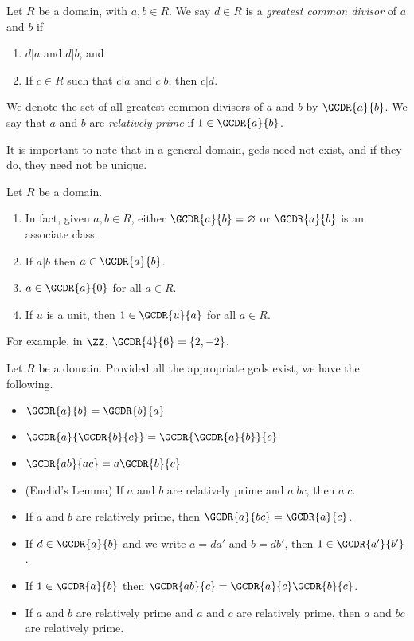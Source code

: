 \documentclass{article}
\begin{document}

\begin{dfn}
Let $R$ be a domain, with $a,b \in R$. We say $d \in R$ is a \emph{greatest common divisor} of $a$ and $b$ if
\begin{enumerate}
\item $d|a$ and $d|b$, and
\item If $c \in R$ such that $c|a$ and $c|b$, then $c|d$.
\end{enumerate}
We denote the set of all greatest common divisors of $a$ and $b$ by $\GCDR{a}{b}$. We say that $a$ and $b$ are \emph{relatively prime} if $1 \in \GCDR{a}{b}$.
\end{dfn}

It is important to note that in a general domain, gcds need not exist, and if they do, they need not be unique.

\begin{prop}
Let $R$ be a domain.
\begin{enumerate}
\item In fact, given $a,b \in R$, either $\GCDR{a}{b} = \varnothing$ or $\GCDR{a}{b}$ is an associate class.
\item If $a|b$ then $a \in \GCDR{a}{b}$.
\item $a \in \GCDR{a}{0}$ for all $a \in R$.
\item If $u$ is a unit, then $1 \in \GCDR{u}{a}$ for all $a \in R$.
\end{enumerate}
\end{prop}

For example, in $\ZZ$, $\GCDR{4}{6} = \{2, -2\}$.

\begin{prop}
Let $R$ be a domain. Provided all the appropriate gcds exist, we have the following.
\begin{itemize}
\item $\GCDR{a}{b} = \GCDR{b}{a}$
\item $\GCDR{a}{\GCDR{b}{c}} = \GCDR{\GCDR{a}{b}}{c}$
\item $\GCDR{ab}{ac} = a\GCDR{b}{c}$
\item (Euclid's Lemma) If $a$ and $b$ are relatively prime and $a|bc$, then $a|c$.
\item If $a$ and $b$ are relatively prime, then $\GCDR{a}{bc} = \GCDR{a}{c}$.
\item If $d \in \GCDR{a}{b}$ and we write $a = da'$ and $b = db'$, then $1 \in \GCDR{a'}{b'}$.
\item If $1 \in \GCDR{a}{b}$ then $\GCDR{ab}{c} = \GCDR{a}{c} \GCDR{b}{c}$.
\item If $a$ and $b$ are relatively prime and $a$ and $c$ are relatively prime, then $a$ and $bc$ are relatively prime.
\end{itemize}
\end{prop}
\end{document}
